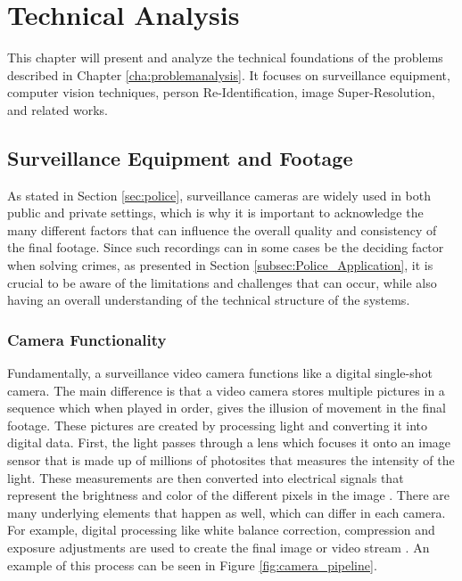 \chapter{Technical Analysis} \label{cha: technicalanalysis}
This chapter will present and analyze the technical foundations of the problems described in Chapter \ref{cha:problemanalysis}. It focuses on surveillance equipment, computer vision techniques, person Re-Identification, image Super-Resolution, and related works.   

\section{Surveillance Equipment and Footage}
\label{subsec:Surveillance_equipment_n_footage}

As stated in Section \ref{sec:police}, surveillance cameras are widely used in both public and private settings, which is why it is important to acknowledge the many different factors that can influence the overall quality and consistency of the final footage. Since such recordings can in some cases be the deciding factor when solving crimes, as presented in Section \ref{subsec:Police_Application}, it is crucial to be aware of the limitations and challenges that can occur, while also having an overall understanding of the technical structure of the systems\cite{arxiv_superres2021}.
 
\subsection{Camera Functionality}
\label{subsubsec:How_cameras_work}
Fundamentally, a surveillance video camera functions like a digital single-shot camera. The main difference is that a video camera stores multiple pictures in a sequence which when played in order, gives the illusion of movement in the final footage. These pictures are created by processing light and converting it into digital data. First, the light passes through a lens which focuses it onto an image sensor that is made up of millions of photosites that measures the intensity of the light. These measurements are then converted into electrical signals that represent the brightness and color of the different pixels in the image \cite{unc_camera_pipeline} \cite{ucocare2024SurvilanceCameraFunction}.
There are many underlying elements that happen as well, which can differ in each camera. For example, digital processing like white balance correction, compression and exposure adjustments are used to create the final image or video stream \cite{unc_camera_pipeline}.
An example of this process can be seen in Figure \ref{fig:camera_pipeline}.

